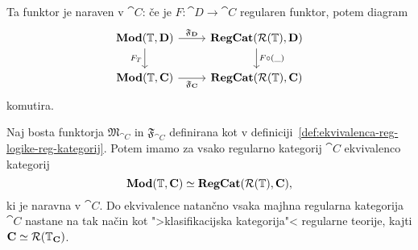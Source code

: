 \documentclass[../kategoricna_logika.tex]{subfiles}
\begin{document}
Ta funktor je naraven v $\cat{C}$: če je $F : \cat{D} \to \cat{C}$
regularen funktor, potem diagram
\begin{equation}\label{diag:naravnost-F}
  \begin{tikzcd}
    \Mod(\T, \cat{D}) \ar[d, "F_T"'] \ar[r, "\mathfrak{F}_{\cat{D}}"] & \cat{RegCat}(\mathcal{R}(\T), \cat{D}) \ar[d, "F \circ (\_)"] \\
    \Mod(\T, \cat{C}) \ar[r, "\mathfrak{F}_{\cat{C}}"'] &
    \cat{RegCat}(\mathcal{R}(\T), \cat{C})
  \end{tikzcd}
\end{equation}
komutira.
\begin{izrek}
  Naj bosta funktorja $\mathfrak{M}_{\cat{C}}$ in
  $\mathfrak{F}_{\cat{C}}$ definirana kot v definiciji~\ref{def:ekvivalenca-reg-logike-reg-kategorij}.
  Potem imamo za vsako
  regularno kategorij $\cat{C}$ ekvivalenco kategorij
  $$\mathbf{Mod}(\mathbb{T}, {\operatorname{\mathbf{C}}}) \simeq {\operatorname{\mathbf{RegCat}}}(\mathcal{R}(\mathbb{T}), {\operatorname{\mathbf{C}}}),$$
  ki je naravna v $\cat{C}$. Do ekvivalence natančno vsaka majhna
  regularna kategorija $\cat{C}$ nastane na tak način kot
  ">klasifikacijska kategorija"< regularne teorije, kajti
  ${\operatorname{\mathbf{C}}} \simeq \mathcal{R}(\mathbb{T}_{{\operatorname{\mathbf{C}}}})$.
\end{izrek}
\end{document}
